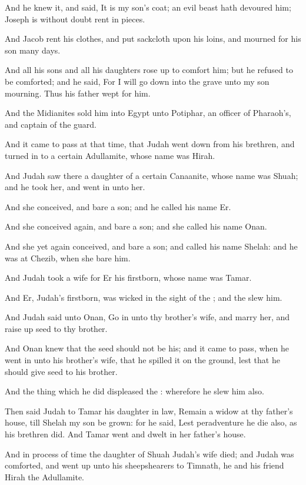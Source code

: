 \Verse And he knew it, and said, It is my son's coat; an evil beast hath devoured him; Joseph is without doubt rent in pieces.

\Verse And Jacob rent his clothes, and put sackcloth upon his loins, and mourned for his son many days.

\Verse And all his sons and all his daughters rose up to comfort him; but he refused to be comforted; and he said, For I will go down into the grave unto my son mourning. Thus his father wept for him.

\Verse And the Midianites sold him into Egypt unto Potiphar, an officer of Pharaoh's, and captain of the guard.

\Chapter
\Verse And it came to pass at that time, that Judah went down from his brethren, and turned in to a certain Adullamite, whose name was Hirah.

\Verse And Judah saw there a daughter of a certain Canaanite, whose name was Shuah; and he took her, and went in unto her.

\Verse And she conceived, and bare a son; and he called his name Er.

\Verse And she conceived again, and bare a son; and she called his name Onan.

\Verse And she yet again conceived, and bare a son; and called his name Shelah: and he was at Chezib, when she bare him.

\Verse And Judah took a wife for Er his firstborn, whose name was Tamar.

\Verse And Er, Judah's firstborn, was wicked in the sight of the \LORD; and the \LORD slew him.

\Verse And Judah said unto Onan, Go in unto thy brother's wife, and marry her, and raise up seed to thy brother.

\Verse And Onan knew that the seed should not be his; and it came to pass, when he went in unto his brother's wife, that he spilled it on the ground, lest that he should give seed to his brother.

\Verse And the thing which he did displeased the \LORD: wherefore he slew him also.

\Verse Then said Judah to Tamar his daughter in law, Remain a widow at thy father's house, till Shelah my son be grown: for he said, Lest peradventure he die also, as his brethren did. And Tamar went and dwelt in her father's house.

\Verse And in process of time the daughter of Shuah Judah's wife died; and Judah was comforted, and went up unto his sheepshearers to Timnath, he and his friend Hirah the Adullamite.

